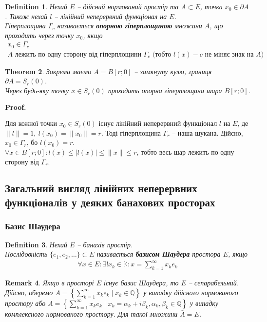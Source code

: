 \documentclass[a4paper, 10pt]{article}
\makeatletter
\theoremstyle{theoremdd}
\newtheorem{theorem}{Theorem}[subsection]
\theoremstyle{theoremdd}
\newtheorem{definition}[theorem]{Definition}
\theoremstyle{theoremdd}
\theoremstyle{theoremdd}
\theoremstyle{theoremdd}
\theoremstyle{theoremdd}
\newtheorem{remark}[theorem]{Remark}
\theoremstyle{theoremdd}
\theoremstyle{theoremdd}
\renewenvironment{proof}[1][Proof.\\]{\par
\pushQED{\hfill \qed}%
\normalfont \topsep6\p@\@plus6\p@\relax
\trivlist
\item\relax
{\bfseries
#1\@addpunct{.}}\hspace\labelsep\ignorespaces
}{%
\popQED\endtrivlist\@endpefalse
}
\makeatother
\begin{document}
\begin{definition}
Нехай $E$ -- дійсний нормований простір та $A \subset E$, точка $x_0 \in \partial A$. Також нехай $l$ -- лінійний неперервний функціонал на $E$.\\
Гіперплощина $\Gamma_c$ називається \textbf{опорною гіперплощиною} множини $A$, що проходить через точку $x_0$, якщо
\begin{align*}
x_0 \in \Gamma_c \\
A \text{ лежить по одну сторону від гіперплощини } \Gamma_c \text{ (тобто $l(x) - c$ не міняє знак на $A$)}
\end{align*}
\end{definition}

\begin{theorem}
Зокрема маємо $A = B[r;0]$ -- замкнуту кулю, границя $\partial A = S_r(0)$.\\
Через будь-яку точку $x \in S_r(0)$ проходить опорна гіперплощина шара $B[r;0]$.
\end{theorem}

\begin{proof}
Для кожної точки $x_0 \in S_r(0)$ існує лінійний неперервний функціонал $l$ на $E$, де $\|l\| = 1,\ l(x_0) = \|x_0\| = r$. Тоді гіперплощина $\Gamma_r$ -- наша шукана. Дійсно, $x_0 \in \Gamma_r$, бо $l(x_0) = r$.\\
$\forall x \in B[r;0]: l(x) \leq |l(x)| \leq \|x\| \leq r$, тобто весь шар лежить по одну сторону від $\Gamma_r$.
\end{proof}

\subsection{Загальний вигляд лінійних неперервних функціоналів у деяких банахових просторах}
\subsubsection{Базис Шаудера}
\begin{definition}
Нехай $E$ -- банахів простір.\\
Послідовність $\{e_1,e_2,\dots\} \subset E$ називається \textbf{базисом Шаудера} простора $E$, якщо
\begin{align*}
\forall x \in E: \exists ! x_k \in \mathbb{K}: x = \displaystyle\sum_{k=1}^\infty x_k e_k
\end{align*}
\end{definition}

\begin{remark}
Якщо в просторі $E$ існує базис Шаудера, то $E$ -- сепарабельний.\\
Дійсно, оберемо $A = \left\{ \displaystyle\sum_{k=1}^\infty x_k e_k \mid x_k \in \mathbb{Q} \right\}$ у випадку дійсного нормованого простору або $A = \left\{ \displaystyle\sum_{k=1}^\infty x_k e_k \mid x_k = \alpha_k + i \beta_k, \alpha_k, \beta_k \in \mathbb{Q} \right\}$ у випадку комплексного нормованого простору. Для такої множини $\bar{A} = E$.
\end{remark}
\end{document}
